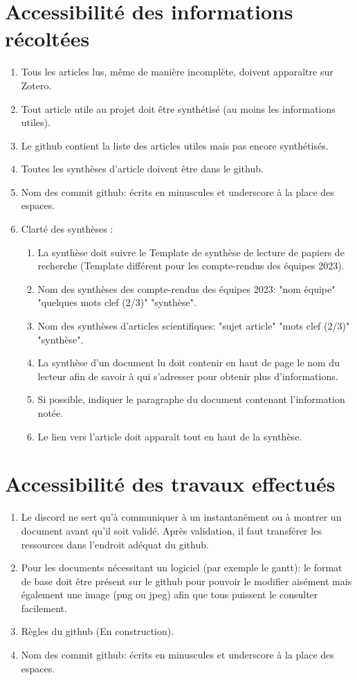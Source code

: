 \documentclass[11pt]{rapport_class}
\begin{document}
\section{Accessibilité des informations récoltées}
\begin{enumerate}
    \item Tous les articles lus, même de manière incomplète, doivent apparaître sur Zotero.
    \item Tout article utile au projet doit être synthétisé (au moins les informations utiles).
    \item Le github contient la liste des articles utiles mais pas encore synthétisés.
    \item Toutes les synthèses d'article doivent être dans le github.
    \item Nom des commit github: écrits en minuscules et underscore à la place des espaces.
    \item Clarté des synthèses :
    \begin{enumerate}
        \item La synthèse doit suivre le Template de synthèse de lecture de papiers de recherche (Template différent pour les compte-rendus des équipes 2023).
        \item Nom des synthèses des compte-rendus des équipes 2023: "nom équipe" "quelques mots clef (2/3)" "synthèse".
        \item Nom des synthèses d'articles scientifiques: "sujet article" "mots clef (2/3)" "synthèse".
        \item La synthèse d'un document lu doit contenir en haut de page le nom du lecteur afin de savoir à qui s'adresser pour obtenir plus d'informations.
        \item Si possible, indiquer le paragraphe du document contenant l'information notée.
        \item Le lien vers l'article doit apparaît tout en haut de la synthèse.
    \end{enumerate}
\end{enumerate}

\section{Accessibilité des travaux effectués}
\begin{enumerate}
    \item Le discord ne sert qu'à communiquer à un instantanément ou à montrer un document avant qu'il soit validé. Après validation, il faut transférer les ressources dans l'endroit adéquat du github.
    \item Pour les documents nécessitant un logiciel (par exemple le gantt): le format de base doit être présent sur le github pour pouvoir le modifier aisément mais également une image (png ou jpeg) afin que tous puissent le consulter facilement.
    \item Règles du github (En construction).
    \item Nom des commit github: écrits en minuscules et underscore à la place des espaces.
\end{enumerate}
\end{document}
